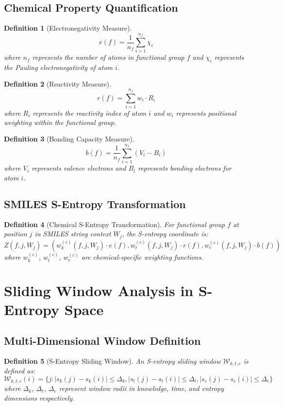 \documentclass[12pt,a4paper]{article}
\newtheorem{definition}{Definition}
\begin{document}
\subsection{Chemical Property Quantification}

\begin{definition}[Electronegativity Measure]
$$e(f) = \frac{1}{n_f} \sum_{i=1}^{n_f} \chi_i$$
where $n_f$ represents the number of atoms in functional group $f$ and $\chi_i$ represents the Pauling electronegativity of atom $i$.
\end{definition}

\begin{definition}[Reactivity Measure]
$$r(f) = \sum_{i=1}^{n_f} w_i \cdot R_i$$
where $R_i$ represents the reactivity index of atom $i$ and $w_i$ represents positional weighting within the functional group.
\end{definition}

\begin{definition}[Bonding Capacity Measure]
$$b(f) = \frac{1}{n_f} \sum_{i=1}^{n_f} (V_i - B_i)$$
where $V_i$ represents valence electrons and $B_i$ represents bonding electrons for atom $i$.
\end{definition}

\subsection{SMILES S-Entropy Transformation}

\begin{definition}[Chemical S-Entropy Transformation]
For functional group $f$ at position $j$ in SMILES string context $W_j$, the S-entropy coordinate is:
$$Z(f,j,W_j) = (w_k^{(c)}(f,j,W_j) \cdot e(f), w_t^{(c)}(f,j,W_j) \cdot r(f), w_e^{(c)}(f,j,W_j) \cdot b(f))$$
where $w_k^{(c)}$, $w_t^{(c)}$, $w_e^{(c)}$ are chemical-specific weighting functions.
\end{definition}

\section{Sliding Window Analysis in S-Entropy Space}

\subsection{Multi-Dimensional Window Definition}

\begin{definition}[S-Entropy Sliding Window]
An S-entropy sliding window $\mathcal{W}_{k,t,e}$ is defined as:
$$\mathcal{W}_{k,t,e}(i) = \{j : |s_k(j) - s_k(i)| \leq \Delta_k, |s_t(j) - s_t(i)| \leq \Delta_t, |s_e(j) - s_e(i)| \leq \Delta_e\}$$
where $\Delta_k$, $\Delta_t$, $\Delta_e$ represent window radii in knowledge, time, and entropy dimensions respectively.
\end{definition}
\end{document}
